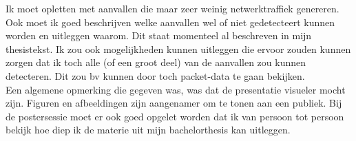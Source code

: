 \noindent Ik moet opletten met aanvallen die maar zeer weinig netwerktraffiek genereren. Ook moet ik goed beschrijven welke aanvallen wel of niet gedetecteert kunnen worden en uitleggen waarom. Dit staat momenteel al beschreven in mijn thesistekst. Ik zou ook mogelijkheden kunnen uitleggen die ervoor zouden kunnen zorgen dat ik toch alle (of een groot deel) van de aanvallen zou kunnen detecteren. Dit zou bv kunnen door toch packet-data te gaan bekijken.\\

\noindent Een algemene opmerking die gegeven was, was dat de presentatie visueler mocht zijn. Figuren en afbeeldingen zijn aangenamer om te tonen aan een publiek. Bij de postersessie moet er ook goed opgelet worden dat ik van persoon tot persoon bekijk hoe diep ik de materie uit mijn bachelorthesis kan uitleggen. 
